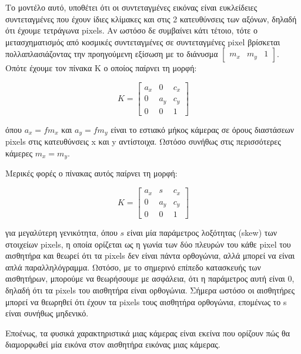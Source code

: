 Το μοντέλο αυτό, υποθέτει ότι οι συντεταγμένες εικόνας είναι ευκλείδειες συντεταγμένες που έχουν ίδιες κλίμακες και στις 2 κατευθύνσεις των αξόνων, δηλαδή ότι έχουμε τετράγωνα pixels. Αν ωστόσο δε συμβαίνει κάτι τέτοιο, τότε ο μετασχηματισμός από κοσμικές συντεταγμένες σε συντεταγμένες pixel βρίσκεται πολλαπλασιάζοντας την προηγούμενη εξίσωση με το διάνυσμα $\begin{bmatrix}m_{x} & m_{y} & 1\end{bmatrix}$. Οπότε έχουμε τον πίνακα K ο οποίος παίρνει τη μορφή:

\begin{equation}
K=
\begin{bmatrix}
a_{x} & 0 & c_{x}\\
0 & a_{y} & c_{y}\\
0 & 0 & 1
\end{bmatrix}
\end{equation}

όπου $a_{x}=fm_{x}$ και $a_{y}=fm_{y}$ είναι το εστιακό μήκος κάμερας σε όρους διαστάσεων pixels στις κατευθύνσεις x και y αντίστοιχα. Ωστόσο συνήθως στις περισσότερες κάμερες $m_{x}=m_{y}$.

Μερικές φορές ο πίνακας αυτός παίρνει τη μορφή:

\begin{equation}
K=
\begin{bmatrix}
a_{x} & s & c_{x}\\
0 & a_{y} & c_{y}\\
0 & 0 & 1
\end{bmatrix}
\end{equation}

για μεγαλύτερη γενικότητα, όπου $s$ είναι μία παράμετρος λοξότητας (skew) των στοιχείων pixels, η οποία ορίζεται ως η γωνία των δύο πλευρών του κάθε pixel του αισθητήρα και θεωρεί ότι τα pixels δεν είναι πάντα ορθογώνια, αλλά μπορεί να είναι απλά παραλληλόγραμμα. Ωστόσο, με το σημερινό επίπεδο κατασκευής των αισθητήρων, μπορούμε να θεωρήσουμε με ασφάλεια, ότι η παράμετρος αυτή είναι 0, δηλαδή ότι τα pixels του αισθητήρα είναι ορθογώνια.
Σήμερα ωστόσο οι αισθητήρες μπορεί να θεωρηθεί ότι έχουν τα pixels τους αισθητήρα ορθογώνια, επομένως το s είναι συνήθως μηδενικό. 





Εποένως, τα φυσικά χαρακτηριστικά μιας κάμερας είναι εκείνα που ορίζουν πώς θα διαμορφωθεί μία εικόνα στον αισθητήρα εικόνας μιας κάμερας. 




